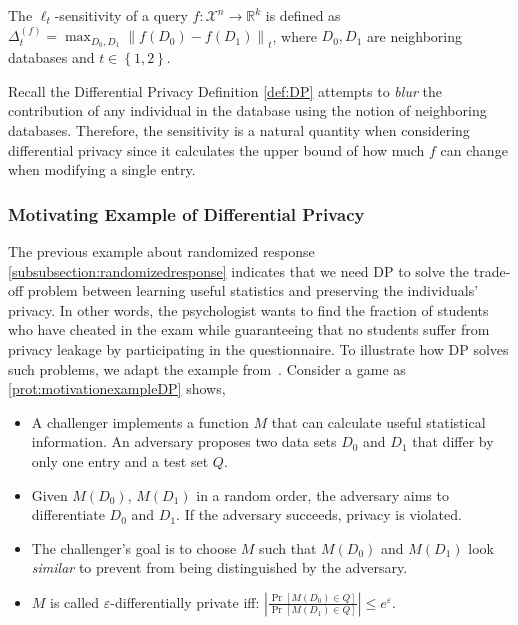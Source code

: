 \begin{definition}
    The $\ell_{t}$-sensitivity of a query $f : \mathcal{X}^{n} \rightarrow \mathbb{R}^{k}$ is deﬁned as $\Delta ^{\left(f\right)}_{t}=\max _{D_{0},D_{1}} \left\| f\left( D_{0}\right) -f\left( D_{1}\right) \right\| _{t}$, where $D_{0},D_{1}$ are neighboring databases and $t \in \left\{1,2\right\}$.
    \label{def:sensitivity}
\end{definition}
Recall the Differential Privacy Definition \autoref{def:DP} attempts to \textit{blur} the contribution of any individual in the database using the notion of neighboring databases. Therefore, the sensitivity is a natural quantity when considering differential privacy since it calculates the upper bound of how much $f$ can change when modifying a single entry.


\subsubsection{Motivating Example of Differential Privacy}
\label{subsubsec:motivatingexampleDP}
The previous example about randomized response \autoref{subsubsection:randomizedresponse} indicates that we need DP to solve the trade-off problem between learning useful statistics and preserving the individuals' privacy. In other words, the psychologist wants to find the fraction of students who have cheated in the exam while guaranteeing that no students suffer from privacy leakage by participating in the questionnaire.
To illustrate how DP solves such problems, we adapt the example from~\cite{simpleexplanDP}.
Consider a game as \autoref{prot:motivationexampleDP} shows,
\begin{itemize}
    \item A challenger implements a function $M$ that can calculate useful statistical information. An adversary proposes two data sets $D_{0}$ and $D_{1}$ that differ by only one entry and a test set $Q$.
    \item Given $M\left( D_{0}\right) $, $M\left( D_{1}\right) $ in a random order, the adversary aims to differentiate $D_{0}$ and $D_{1}$. If the adversary succeeds, privacy is violated.
    \item The challenger's goal is to choose $M$ such that $M\left( D_{0}\right) $ and $M\left( D_{1}\right) $ look \textit{similar} to prevent from being distinguished by the adversary.
    \item $M$ is called $\varepsilon$-differentially private iff: $\left| \frac{\Pr \left[ M\left( D_{0}\right) \in Q\right] }{\Pr \left[ M\left( D_{1}\right) \in Q \right] }\right|\leq e^{\varepsilon}$.
\end{itemize}

